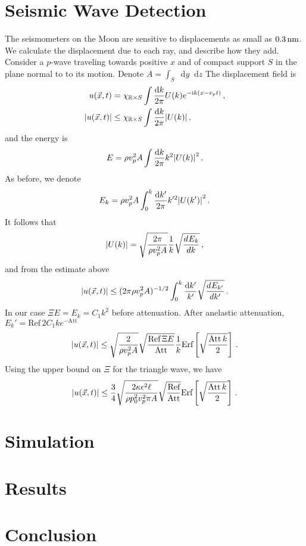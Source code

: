 \documentclass[prd,reprint,10pt,tightenlines]{revtex4-1}
\newcommand*\diff{\mathop{}\!\mathrm{d}}
\newcommand*\R{\mathbb R}
\newcommand*\te[1]{\text{#1}}
\newcommand*\ps[1]{\left[#1\right]}
\newcommand*\f[2]{\frac{#1}{#2}}
\newcommand*\I{\te{i}}
\newcommand*\td[3]{\frac{d^{#3}#1}{d #2^{#3}}}
\begin{document}
\section{Seismic Wave Detection}
The seismometers on the Moon are sensitive to displacements as small as $0.3\te{\,nm}$. We calculate the displacement due to each ray, and describe how they add. Consider a $p$-wave traveling towards positive $x$ and of compact support $S$ in the plane normal to to its motion. Denote $A =\int_S\diff y\diff z$ The displacement field is
\begin{align}
u(\vec x,t) &= \chi_{\R\times S}\int\f{\diff k}{2\pi}U(k)e^{-\I k(x-v_p t)}\,,\\
\abs{u(\vec x,t)}&\leq\chi_{\R\times S}\int\f{\diff k}{2\pi}\abs{U(k)}\,,
\end{align}
and the energy is
\begin{align}
E = \rho v_p^2 A\int\f{\diff k}{2\pi}k^2\abs{U(k)}^2\,.
\end{align}
As before, we denote
\begin{align}
E_k = \rho v_p^2 A\int_0^k\f{\diff k'}{2\pi}k'^2\abs{U(k')}^2\,.
\end{align}
It follows that
\begin{align}
\abs{U(k)} = \sqrt{\f{2\pi}{\rho v_p^2 A}}\f1k\sqrt{\td{E_k}{k}{}}\,,
\end{align}
and from the estimate above
\begin{align}
\abs{u(\vec x,t)}\leq(2\pi\rho v_p^2 A)^{-1/2}\int_0^k\f{\diff k'}{k'}\sqrt{\td{E_{k'}}{k'}{}}\,.
\end{align}
In our case $\Xi E=E_k = C_1 k^2$ before attenuation. After anelastic attenuation, $E_k' =\te{Ref}\,2C_1 k e^{-\te{Att}}$
\begin{align}
\abs{u(\vec x,t)}\leq\sqrt{\f{2}{\rho v_p^2 A}}\sqrt{\f{\te{Ref}\,\Xi E}{\te{Att}}}\f1k\te{Erf}\ps{\sqrt{\f{\te{Att}\,k}{2}}}\,.
\end{align}
Using the upper bound on $\Xi$ for the triangle wave, we have
\begin{align}
\abs{u(\vec x,t)}\leq \f{3}{4}\sqrt{\f{2\kappa \epsilon^2 \ell}{\rho p_0^2 v_p^2 \pi A  }}\sqrt{\f{\te{Ref}}{\te{Att}}}\te{Erf}\ps{\sqrt{\f{\te{Att}\,k}{2}}}\,.
\end{align}
\section{Simulation}

\section{Results}

\section{Conclusion}
\end{document}
